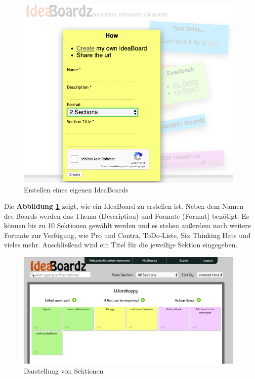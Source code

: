 \begin{figure}[H]
  \begin{center}
    \includegraphics[scale=0.3]{img/ideaBoardz1}
	\caption{Erstellen eines eigenen IdeaBoards} 
	\label{fig:erstellen des eigenen ideaboards}
  \end{center}   
\end{figure}

Die \textbf{Abbildung \ref{fig:erstellen des eigenen ideaboards}} zeigt, wie ein IdeaBoard zu erstellen ist. Neben dem Namen des Boards werden das Thema (Description) und Formate (Format) benötigt. Es können bis zu 10 Sektionen gewählt werden und es stehen außerdem noch weitere Formate zur Verfügung, wie Pro und Contra, ToDo-Liste, Six Thinking Hats und vieles mehr. Anschließend wird ein Titel für die jeweilige Sektion eingegeben.

\begin{figure}[H]
  \begin{center}
    \includegraphics[scale=0.35]{img/ideaBoardz2}
	\caption{Darstellung von Sektionen} 
	\label{fig:darstellung von sektionen}
  \end{center}   
\end{figure}

